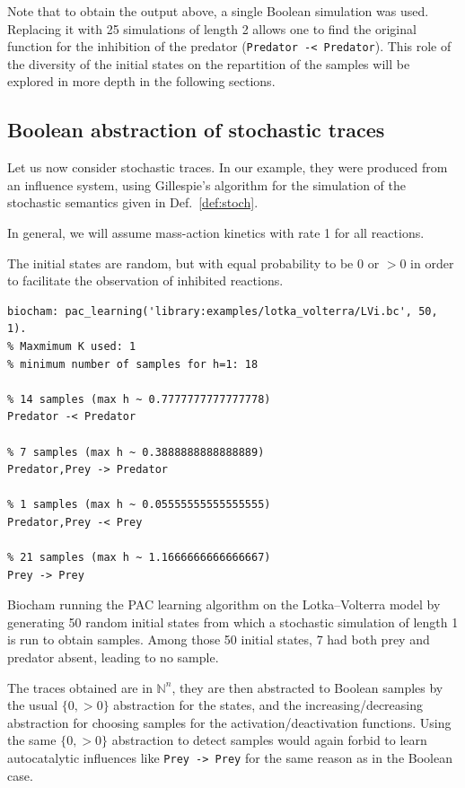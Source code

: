 \documentclass{llncs}
\newif\ifcomments%
\newcommand{\francois}[1]{\ifcomments\textcolor{blue}{#1}\fi}
\begin{document}
Note that to obtain the output above, a single Boolean simulation was used.
Replacing it with 25 simulations of length 2 allows one to find the original
function for the inhibition of the predator (\texttt{Predator -< Predator}).
This role of the diversity of the initial states on the repartition of the
samples will be explored in more depth in the following sections.

\subsection{Boolean abstraction of stochastic traces}


\francois{On doit etre clair sur la nature des traces considerees (seuils/activation boolleenne/stochastique). Je focaliserais sur trace stochastique et semantique booleenne d'activation.}

Let us now consider stochastic traces. In our example, they were
produced from an influence system, using Gillespie's
algorithm for the simulation of the stochastic semantics given in
Def.~\ref{def:stoch}.

In general, we will assume mass-action kinetics with rate 1 for all reactions.

The initial states are random, but with equal probability to be 0 or $>0$ in
order to facilitate the observation of inhibited reactions.

\begin{listfig}[htb]
      \begin{lstlisting}
biocham: pac_learning('library:examples/lotka_volterra/LVi.bc', 50, 1).
% Maxmimum K used: 1
% minimum number of samples for h=1: 18

% 14 samples (max h ~ 0.7777777777777778)
Predator -< Predator

% 7 samples (max h ~ 0.3888888888888889)
Predator,Prey -> Predator

% 1 samples (max h ~ 0.05555555555555555)
Predator,Prey -< Prey

% 21 samples (max h ~ 1.1666666666666667)
Prey -> Prey
   \end{lstlisting}
   \caption{Biocham running the PAC learning algorithm on the Lotka--Volterra
      model by generating 50 random initial states from which a stochastic
      simulation of length 1 is run to obtain samples. Among those 50 initial
     states, 7 had both prey and predator absent, leading to no sample.}%
   \label{lst:stoch_lv}
\end{listfig}

The traces obtained are in ${\mathbb{N}}^n$, they are then abstracted to
Boolean samples by the usual $\{0, >0\}$ abstraction for the states, and the
increasing/decreasing abstraction for choosing samples for the
activation/deactivation functions. Using the same $\{0, >0\}$ abstraction to
detect samples would again forbid to learn autocatalytic influences like
\texttt{Prey -> Prey} for the same reason as in the Boolean case.
\end{document}
